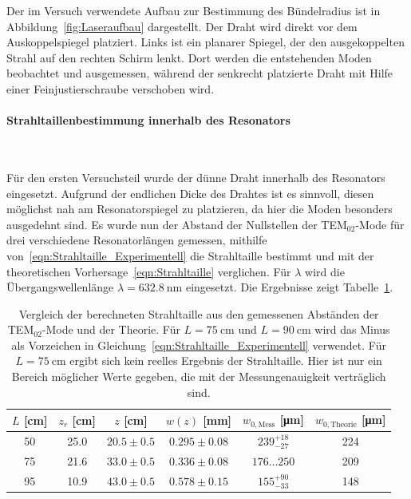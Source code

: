 \documentclass[a4paper,twoside,final]{article}
\begin{document}


Der im Versuch verwendete Aufbau zur Bestimmung des Bündelradius ist in Abbildung~\ref{fig:Laseraufbau} dargestellt. Der Draht wird direkt vor dem Auskoppelspiegel platziert. Links ist ein planarer Spiegel, der den ausgekoppelten Strahl auf den rechten Schirm lenkt. Dort werden die entstehenden Moden beobachtet und ausgemessen, während der senkrecht platzierte Draht mit Hilfe einer Feinjustierschraube verschoben wird.

\paragraph{Strahltaillenbestimmung innerhalb des Resonators}$~$

Für den ersten Versuchsteil wurde der dünne Draht innerhalb des Resonators eingesetzt. Aufgrund der endlichen Dicke des Drahtes ist es sinnvoll, diesen möglichst nah am Resonatorspiegel zu platzieren, da hier die Moden besonders ausgedehnt sind. Es wurde nun der Abstand der Nullstellen der TEM$_{02}$-Mode für drei verschiedene Resonatorlängen gemessen, mithilfe von~\eqref{eqn:Strahltaille_Experimentell} die Strahltaille bestimmt und mit der theoretischen Vorhersage~\eqref{eqn:Strahltaille} verglichen. Für $\lambda$ wird die Übergangswellenlänge $\lambda = \SI{632.8}{\nano\metre}$ eingesetzt. Die Ergebnisse zeigt Tabelle~\ref{tab:Strahltaille_innerhalb}.

\begin{table}[htp]
  \centering
  \caption{Vergleich der berechneten Strahltaille aus den gemessenen Abständen der TEM$_{02}$-Mode und der Theorie. Für $L=\SI{75}{\centi\metre}$ und $L=\SI{90}{\centi\metre}$ wird das Minus als Vorzeichen in Gleichung~\eqref{eqn:Strahltaille_Experimentell} verwendet. Für $L=\SI{75}{\centi\metre}$ ergibt sich kein reelles Ergebnis der Strahltaille. Hier ist nur ein Bereich möglicher Werte gegeben, die mit der Messungenauigkeit verträglich sind.}
  \begin{tabular}{c c c c c c}
    \toprule
    $L$ [\si{\centi\metre}] & $z_r$ [\si{\centi\metre}] &$z$ [\si{\centi\metre}]  &  $w(z)$ [\si{\milli\metre}] & $w_{0,\text{Mess}}$ [\si{\micro\metre}] & $w_{0,\text{Theorie}}$ [\si{\micro\metre}]\\
    \midrule
    50 & 25.0 & $20.5\pm 0.5$ & $0.295 \pm 0.08$ & $239_{-27}^{+18}$  & 224\\
    75 & 21.6 & $33.0\pm 0.5$ & $0.336 \pm 0.08$ & $176\hdots250$& 209\\
    95 & 10.9 & $43.0\pm 0.5$ & $0.578 \pm 0.15$ & $155_{-33}^{+90}$ & 148\\
    \bottomrule
  \end{tabular}
  \label{tab:Strahltaille_innerhalb}
\end{table}
\end{document}
